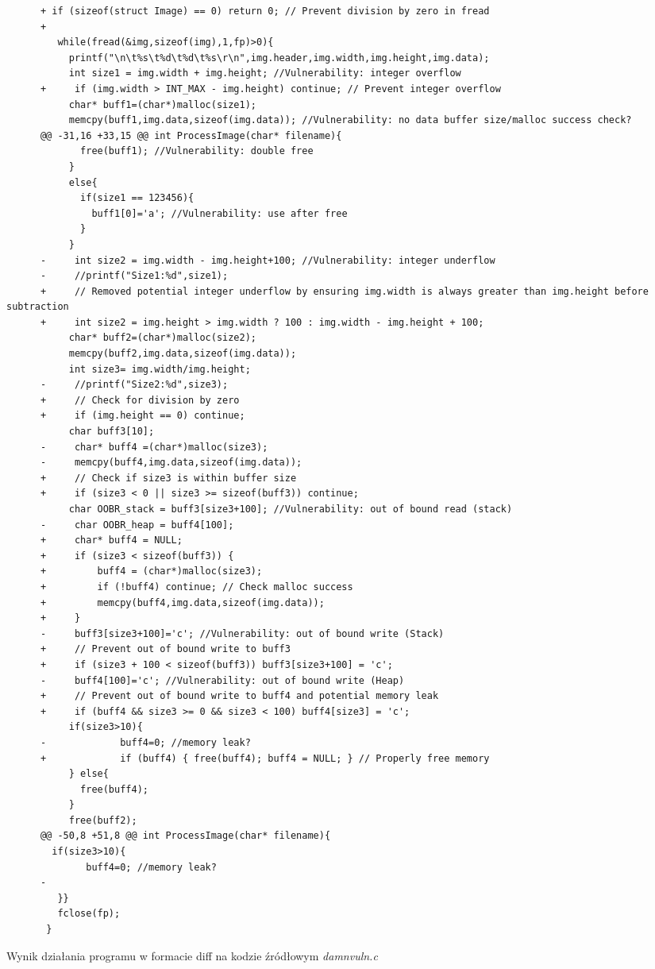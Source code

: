 \begin{listing}[H]
\begin{verbatim}
      +	if (sizeof(struct Image) == 0) return 0; // Prevent division by zero in fread
      +
         while(fread(&img,sizeof(img),1,fp)>0){
           printf("\n\t%s\t%d\t%d\t%s\r\n",img.header,img.width,img.height,img.data);
           int size1 = img.width + img.height; //Vulnerability: integer overflow
      +		if (img.width > INT_MAX - img.height) continue; // Prevent integer overflow
           char* buff1=(char*)malloc(size1);
           memcpy(buff1,img.data,sizeof(img.data)); //Vulnerability: no data buffer size/malloc success check?
      @@ -31,16 +33,15 @@ int ProcessImage(char* filename){
             free(buff1); //Vulnerability: double free
           }
           else{
             if(size1 == 123456){
               buff1[0]='a'; //Vulnerability: use after free
             }
           }
      -		int size2 = img.width - img.height+100; //Vulnerability: integer underflow
      -		//printf("Size1:%d",size1);
      +		// Removed potential integer underflow by ensuring img.width is always greater than img.height before subtraction
      +		int size2 = img.height > img.width ? 100 : img.width - img.height + 100;
           char* buff2=(char*)malloc(size2);
           memcpy(buff2,img.data,sizeof(img.data));
           int size3= img.width/img.height;
      -		//printf("Size2:%d",size3);
      +		// Check for division by zero
      +		if (img.height == 0) continue;
           char buff3[10];
      -		char* buff4 =(char*)malloc(size3);
      -		memcpy(buff4,img.data,sizeof(img.data));
      +		// Check if size3 is within buffer size
      +		if (size3 < 0 || size3 >= sizeof(buff3)) continue;
           char OOBR_stack = buff3[size3+100]; //Vulnerability: out of bound read (stack)
      -		char OOBR_heap = buff4[100];
      +		char* buff4 = NULL;
      +		if (size3 < sizeof(buff3)) {
      +			buff4 = (char*)malloc(size3);
      +			if (!buff4) continue; // Check malloc success
      +			memcpy(buff4,img.data,sizeof(img.data));
      +		}
      -		buff3[size3+100]='c'; //Vulnerability: out of bound write (Stack)
      +		// Prevent out of bound write to buff3
      +		if (size3 + 100 < sizeof(buff3)) buff3[size3+100] = 'c';
      -		buff4[100]='c'; //Vulnerability: out of bound write (Heap)
      +		// Prevent out of bound write to buff4 and potential memory leak
      +		if (buff4 && size3 >= 0 && size3 < 100) buff4[size3] = 'c';
           if(size3>10){
      -				buff4=0; //memory leak?
      +				if (buff4) { free(buff4); buff4 = NULL; } // Properly free memory
           } else{
             free(buff4);
           }
           free(buff2);
      @@ -50,8 +51,8 @@ int ProcessImage(char* filename){
        if(size3>10){
              buff4=0; //memory leak?
      -
         }}
         fclose(fp);
       }
    \end{verbatim}
    \caption{Wynik działania programu w formacie diff na kodzie źródłowym \textit{damnvuln.c}}
    \label{lst:code2}
\end{listing}

